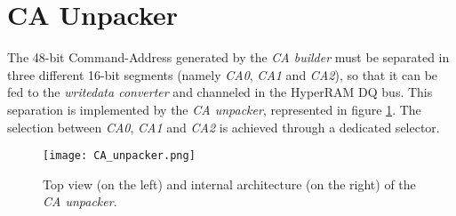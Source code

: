 \documentclass[10pt, english, a4paper, titlepage, oneside]{book}
\begin{document}
\section{CA Unpacker} \label{CA Unpacker}
\vspace{2mm}
The 48-bit Command-Address generated by the \textit{CA builder} must be separated in three different 16-bit segments (namely \textit{CA0}, \textit{CA1} and \textit{CA2}), so that it can be fed to the \textit{writedata converter} and channeled in the HyperRAM DQ bus. This separation is implemented by the \textit{CA unpacker}, represented in figure \ref{CA_unpacker}. The selection between \textit{CA0}, \textit{CA1} and \textit{CA2} is achieved through a dedicated selector.
\vspace{6mm}
\begin{figure}[H]
    \centering
    \captionsetup{width=16cm}
    \texttt{[image: CA\_unpacker.png]}
    \vspace{4mm}
    \caption{\centering Top view (on the left) and internal architecture (on the right) of the \textit{CA unpacker}.}
    \label{CA_unpacker}
\end{figure}
\vspace{4mm}
\end{document}
